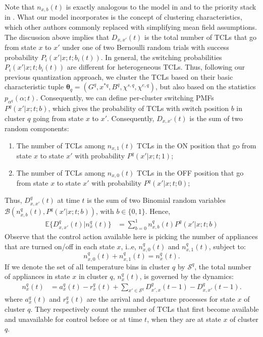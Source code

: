 \documentclass[10pt]{IEEEtran}
\begin{document}
Note that $n_{x,b}(t)$ is exactly analogous to the model in \cite{mathieu} and to the priority stack in \cite{hao2013generalized}. What our model incorporates is the concept of clustering characteristics, which other authors commonly replaced with simplifying mean field assumptions. 
The discussion above implies that $D_{x,x'}(t)$ is the total number of TCLs that go from state $x$ to $x'$ under one of two Bernoulli random trials with success probability $P_i(x'|x;t;b_i(t))$. In general, the switching probabilities $P_i(x'|x;t;b_i(t))$ are different for heterogeneous TCLs.  
Thus, following our previous quantization approach, we cluster the TCLs based on their basic characteristic tuple $\boldsymbol{\theta}_q = (G^q, x^{*q}, B^q,\chi^{s,q},\chi^{e,q})$,  but also based on the statistics $p_{\alpha^q}(\alpha;t)$. Consequently, we can define per-cluster switching PMFs $P^q(x'|x;t;b)$, which gives the probability of TCLs with switch position $b$ in cluster $q$ going from state $x$ to $x'$.  Consequently, $D_{x,x'}(t)$ is the sum of two random components:
\begin{enumerate}
\item The number of TCLs among $n_{x,1}(t)$ TCLs in the ON position that go from state $x$ to state $x'$ with probability $P^q(x'|x;t;1)$;
\item The number of TCLs among $n_{x,0}(t)$ TCLs in the OFF position that go from state $x$ to state $x'$ with probability $P^q(x'|x;t;0)$;
\end{enumerate}
Thus, $D_{x,x'}^q(t)$ at time $t$ is the sum of two Binomial random variables ${\mathcal B}(n_{x,b}^q(t),P^q(x'|x;t;b))$, with $b\in \{0,1\}$.  Hence,
\begin{align}
{\mathbb E}\{D_{x,x'}^q(t)|n^q_x(t)\}&=\sum_{b=0}^1n_{x,b}^q(t)P^q(x'|x;t;b)
\end{align}
Observe that the control action available here is picking the number of appliances that are turned on/off in each state $x$, i..e, $n_{x,0}^q(t)$ and $n_{x,1}^q(t)$, subject to:
\begin{equation}
n_{x,0}^q(t) + n_{x,1}^q(t) = n_{x}^q(t).
\end{equation}
If we denote the set of  all temperature bins in cluster $q$ by ${\mathcal S}^q$, the total number of appliances in state $x$ in cluster $q$, $n_{x}^q(t)$, is governed by the dynamics: 
\begin{align}
n^q_x(t)&\!=\!a_x^q(t)\!-\! r_x^q(t)+\!\!\!\!\sum_{x'\in {\mathcal S}^q} \!\!\!D_{x',x}^q(t-1)\!-\!D_{x,x'}^q(t-1).\label{nqxdyn}
\end{align}
where $a_x^q(t)$ and $r_x^q(t)$ are the arrival and departure processes for state $x$ of cluster $q$. They respectively count the number of TCLs that first become available and unavailable for control before or at time $t$, when they are at state $x$ of cluster $q$.
\end{document}
